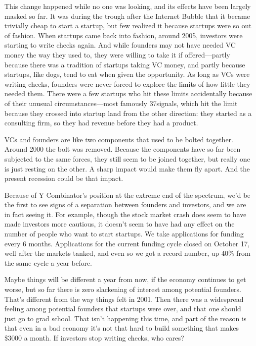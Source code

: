 \documentclass[12pt]{book}
\begin{document}
This change happened while no one was looking, and its effects have been
largely masked so far. It was during the trough after the Internet
Bubble that it became trivially cheap to start a startup, but few
realized it because startups were so out of fashion. When startups came
back into fashion, around 2005, investors were starting to write checks
again. And while founders may not have needed VC money the way they used
to, they were willing to take it if offered---partly because there was a
tradition of startups taking VC money, and partly because startups, like
dogs, tend to eat when given the opportunity. As long as VCs were
writing checks, founders were never forced to explore the limits of how
little they needed them. There were a few startups who hit these limits
accidentally because of their unusual circumstances---most famously
37signals, which hit the limit because they crossed into startup land
from the other direction: they started as a consulting firm, so they had
revenue before they had a product.

VCs and founders are like two components that used to be bolted
together. Around 2000 the bolt was removed. Because the components have
so far been subjected to the same forces, they still seem to be joined
together, but really one is just resting on the other. A sharp impact
would make them fly apart. And the present recession could be that
impact.

Because of Y Combinator's position at the extreme end of the spectrum,
we'd be the first to see signs of a separation between founders and
investors, and we are in fact seeing it. For example, though the stock
market crash does seem to have made investors more cautious, it doesn't
seem to have had any effect on the number of people who want to start
startups. We take applications for funding every 6 months. Applications
for the current funding cycle closed on October 17, well after the
markets tanked, and even so we got a record number, up 40\% from the
same cycle a year before.

Maybe things will be different a year from now, if the economy continues
to get worse, but so far there is zero slackening of interest among
potential founders. That's different from the way things felt in 2001.
Then there was a widespread feeling among potential founders that
startups were over, and that one should just go to grad school. That
isn't happening this time, and part of the reason is that even in a bad
economy it's not that hard to build something that makes \$3000 a month.
If investors stop writing checks, who cares?
\end{document}
